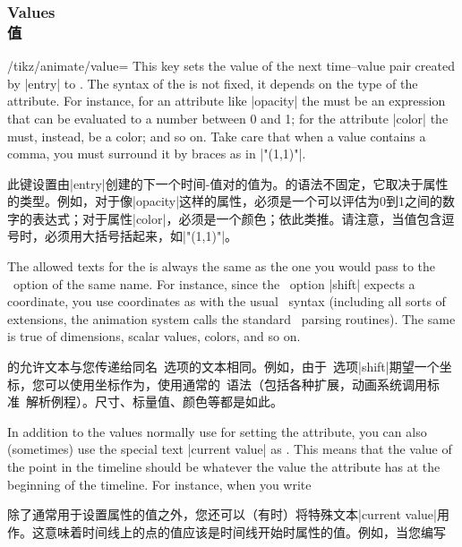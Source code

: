 \subsubsection{Values\\值}
\label{section-anim-def-values}

\begin{key}{/tikz/animate/value=}
    This key sets the value of the next time--value pair created by |entry| to
    . The syntax of the  is not fixed, it depends on
    the type of the attribute. For instance, for an attribute like |opacity|
    the  must be an expression that can be evaluated to a number
    between 0 and 1; for the attribute |color| the  must, instead,
    be a color; and so on. Take care that when a value contains a comma, you
    must surround it by braces as in |"{(1,1)}"|.

    此键设置由|entry|创建的下一个时间-值对的值为。的语法不固定，它取决于属性的类型。例如，对于像|opacity|这样的属性，必须是一个可以评估为0到1之间的数字的表达式；对于属性|color|，必须是一个颜色；依此类推。请注意，当值包含逗号时，必须用大括号括起来，如|"{(1,1)}"|。

    The allowed texts for the  is always the same as the one you
    would pass to the \tikzname\ option of the same name. For instance, since
    the \tikzname\ option |shift| expects a coordinate, you use coordinates as
     with the usual \tikzname\ syntax (including all sorts of
    extensions, the animation system calls the standard \tikzname\ parsing
    routines). The same is true of dimensions, scalar values, colors, and so
    on.

    的允许文本与您传递给同名\tikzname\ 选项的文本相同。例如，由于\tikzname\ 选项|shift|期望一个坐标，您可以使用坐标作为，使用通常的\tikzname\ 语法（包括各种扩展，动画系统调用标准\tikzname\ 解析例程）。尺寸、标量值、颜色等都是如此。

    In addition to the values normally use for setting the attribute, you can
    also (sometimes) use the special text |current value| as . This
    means that the value of the point in the timeline should be whatever the
    value the attribute has at the beginning of the timeline. For instance,
    when you write
    
    除了通常用于设置属性的值之外，您还可以（有时）将特殊文本|current value|用作。这意味着时间线上的点的值应该是时间线开始时属性的值。例如，当您编写



\end{key}
